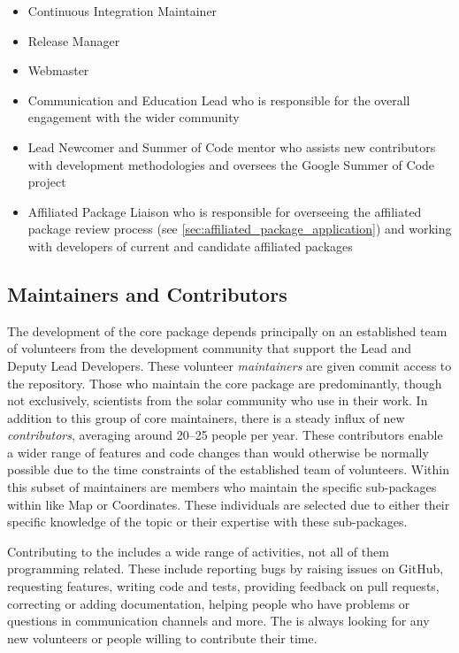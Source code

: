 \begin{itemize}
    \item Continuous Integration Maintainer
    \item Release Manager
    \item Webmaster
    \item Communication and Education Lead who is responsible for the overall engagement with the wider community
    \item Lead Newcomer and Summer of Code mentor who assists new contributors with \sunpyproj development methodologies and oversees the Google Summer of Code project
    \item Affiliated Package Liaison who is responsible for overseeing the affiliated package review process (see \autoref{sec:affiliated_package_application}) and working with developers of current and candidate affiliated packages
\end{itemize}

\subsection{Maintainers and Contributors}

The development of the \sunpypkg core package depends principally on an established team of volunteers from the development community that support the Lead and Deputy Lead Developers.
These volunteer \textit{maintainers} are given commit access to the \sunpypkg repository.
Those who maintain the \sunpypkg core package are predominantly, though not exclusively, scientists from the solar community who use \sunpypkg in their work.
In addition to this group of core maintainers, there is a steady influx of new \textit{contributors}, averaging around 20--25 people per year.
These contributors enable a wider range of features and code changes than would otherwise be normally possible due to the time constraints of the established team of volunteers.
Within this subset of maintainers are members who maintain the specific sub-packages within \sunpypkg like Map or Coordinates.
These individuals are selected due to either their specific knowledge of the topic or their expertise with these sub-packages.

Contributing to the \sunpyproj includes a wide range of activities, not all of them programming related.
These include reporting bugs by raising issues on GitHub, requesting features, writing code and tests, providing feedback on pull requests, correcting or adding documentation, helping people who have problems or questions in communication channels and more.
The \sunpyproj is always looking for any new volunteers or people willing to contribute their time.
